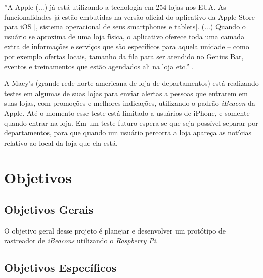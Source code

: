 \documentclass[
		12pt,				%
		openright,			%
		oneside,			%
		a4paper,			%
		chapter=TITLE,		%
		english,			%
		brazil				%
	]{abntex2}
\begin{document}
\begin{citacao}
''A Apple (...) já está utilizando a tecnologia em 254 lojas nos EUA. As funcionalidades já estão embutidas na versão oficial do aplicativo da Apple Store para iOS [, sistema operacional de seus smartphones e tablets]. (...) Quando o usuário se aproxima de uma loja física, o aplicativo oferece toda uma camada extra de informações e serviços que são específicos para aquela unidade – como por exemplo ofertas locais, tamanho da fila para ser atendido no Genius Bar, eventos e treinamentos que estão agendados ali na loja etc.'' \cite{teixeira-beacon}.
\end{citacao}

A Macy's (grande rede norte americana de loja de departamentos) está realizando testes em algumas de suas lojas para enviar alertas a pessoas que entrarem em suas lojas, com promoções e melhores indicações, utilizando o padrão \textit{iBeacon} da Apple. Até o momento esse teste está limitado a usuários de iPhone, e somente quando entrar na loja. Em um teste futuro espera-se que seja possível separar por departamentos, para que quando um usuário percorra a loja apareça as notícias relativo ao local da loja que ela está. \cite{kastrenakes-macys-beacon}



\chapter{Objetivos}\label{cap:objetivos-justificativa}

\section{Objetivos Gerais}\label{sec:objetivos-gerais}

O objetivo geral desse projeto é planejar e desenvolver um protótipo de rastreador de \textit{iBeacons} utilizando o \textit{Raspberry Pi}.


\section{Objetivos Específicos}\label{sec:objetivos-especificos}
\end{document}
